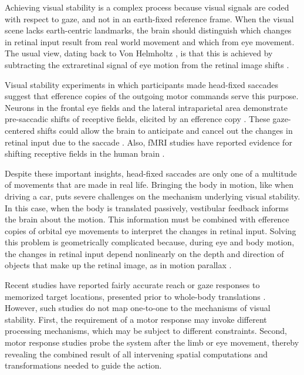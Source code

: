 Achieving visual stability is a complex process because visual signals are coded with respect to gaze, and not in an earth-fixed reference frame. When the visual scene lacks earth-centric landmarks, the brain should distinguish which changes in retinal input result from real world movement and which from eye movement. The usual view, dating back to Von Helmholtz \citeyear{vonhelmholtz1867}, is that this is achieved by subtracting the extraretinal signal of eye motion from the retinal image shifts \cite{wexler2005}.

Visual stability experiments in which participants made head-fixed saccades suggest that efference copies of the outgoing motor commands serve this purpose. Neurons in the frontal eye fields and the lateral intraparietal area demonstrate pre-saccadic shifts of receptive fields, elicited by an efference copy \cite{duhamel1992, kusunoki2003}. These gaze-centered shifts could allow the brain to anticipate and cancel out the changes in retinal input due to the saccade \cite{sommer2006}. Also, fMRI studies have reported evidence for shifting receptive fields in the human brain \cite{medendorp2003a}. 

Despite these important insights, head-fixed saccades are only one of a multitude of movements that are made in real life. Bringing the body in motion, like when driving a car, puts severe challenges on the mechanism underlying visual stability. In this case, when the body is translated passively, vestibular feedback informs the brain about the motion. This information must be combined with efference copies of orbital eye movements to interpret the changes in retinal input. Solving this problem is geometrically complicated because, during eye and body motion, the changes in retinal input depend nonlinearly on the depth and direction of objects that make up the retinal image, as in motion parallax \cite{medendorp2003b}.

Recent studies have reported fairly accurate reach or gaze responses to memorized target locations, presented prior to whole-body translations \cite<see for review:>{klier2008, medendorp2011}. However, such studies do not map one-to-one to the mechanisms of visual stability. First, the requirement of a motor response may invoke different processing mechanisms, which may be subject to different constraints. Second, motor response studies probe the system after the limb or eye movement, thereby revealing the combined result of all intervening spatial computations and transformations needed to guide the action.

